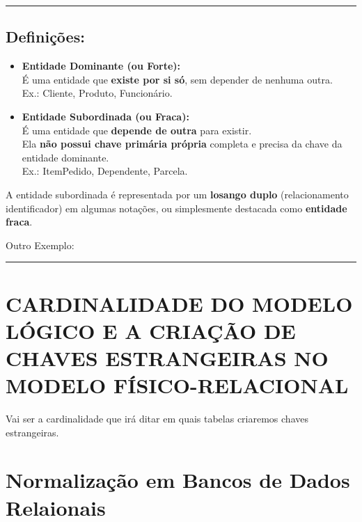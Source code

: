 \documentclass[
]{book}
\begin{document}
\begin{center}\rule{0.5\linewidth}{0.5pt}\end{center}

\subsection{Definições:}\label{definiuxe7uxf5es}

\begin{itemize}
\item
  \textbf{Entidade Dominante (ou Forte):}\\
  É uma entidade que \textbf{existe por si só}, sem depender de nenhuma outra.\\
  Ex.: Cliente, Produto, Funcionário.
\item
  \textbf{Entidade Subordinada (ou Fraca):}\\
  É uma entidade que \textbf{depende de outra} para existir.\\
  Ela \textbf{não possui chave primária própria} completa e precisa da chave da entidade dominante.\\
  Ex.: ItemPedido, Dependente, Parcela.
\end{itemize}

A entidade subordinada é representada por um \textbf{losango duplo} (relacionamento identificador) em algumas notações, ou simplesmente destacada como \textbf{entidade fraca}.



Outro Exemplo:



\begin{center}\rule{0.5\linewidth}{0.5pt}\end{center}

\section{CARDINALIDADE DO MODELO LÓGICO E A CRIAÇÃO DE CHAVES ESTRANGEIRAS NO MODELO FÍSICO-RELACIONAL}\label{cardinalidade-do-modelo-luxf3gico-e-a-criauxe7uxe3o-de-chaves-estrangeiras-no-modelo-fuxedsico-relacional}

Vai ser a cardinalidade que irá ditar em quais tabelas criaremos chaves estrangeiras.

\section{Normalização em Bancos de Dados Relaionais}\label{normalizauxe7uxe3o-em-bancos-de-dados-relaionais}
\end{document}
